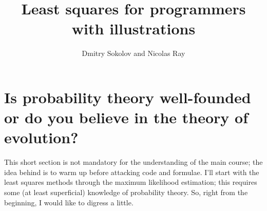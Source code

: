 \documentclass[notitlepage]{report}
\title{{\Huge Least squares for programmers}\\
{\large with illustrations}\\
\vspace{20mm}}
\author{Dmitry Sokolov and Nicolas Ray}
\date{}
\makeatletter
\newcommand*{\toccontents}{\@starttoc{toc}}
\makeatother
\begin{document}
\maketitle

\vspace{10mm}

\toccontents

\vspace{10mm}


\chapter{Is probability theory well-founded or do you believe in the theory of evolution?}

This short section is not mandatory for the understanding of the main course; 
the idea behind is to warm up before attacking code and formulae.
I’ll start with the least squares methods through the maximum likelihood estimation;
this requires some (at least superficial) knowledge of probability theory. 
So, right from the beginning, I would like to digress a little.
\end{document}
